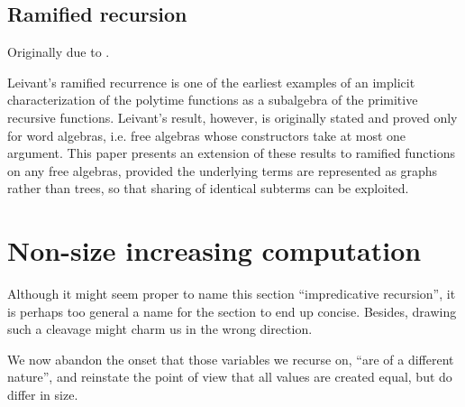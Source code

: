 \subsection{Ramified recursion}

Originally due to \cite{leivant-1995}. 

Leivant’s ramified recurrence is one of the earliest examples of an implicit
characterization of the polytime functions as a subalgebra of the primitive
recursive functions. Leivant’s result, however, is originally stated and proved
only for word algebras, i.e. free algebras whose constructors take at most one
argument. This paper presents an extension of these results to ramified
functions on any free algebras, provided the underlying terms are represented
as graphs rather than trees, so that sharing of identical subterms can be
exploited. \cite{dal-lago-et-al-2010}

\section{Non-size increasing computation}

Although it might seem proper to name this section ``impredicative recursion'',
it is perhaps too general a name for the section to end up concise. Besides,
drawing such a cleavage might charm us in the wrong direction.

We now abandon the onset that those variables we recurse on, ``are of a
different nature'', and reinstate the point of view that all values are created
equal, but do differ in size.
